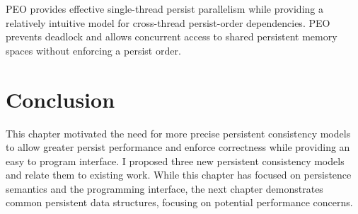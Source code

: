 PEO provides effective single-thread persist parallelism while providing a relatively intuitive model for cross-thread persist-order dependencies.
PEO prevents deadlock and allows concurrent access to shared persistent memory spaces without enforcing a persist order.

\section{Conclusion}
\label{sec:PMC:Conclusion}

This chapter motivated the need for more precise persistent consistency models to allow greater persist performance and enforce correctness while providing an easy to program interface.
I proposed three new persistent consistency models and relate them to existing work.
While this chapter has focused on persistence semantics and the programming interface, the next chapter demonstrates common persistent data structures, focusing on potential performance concerns.
